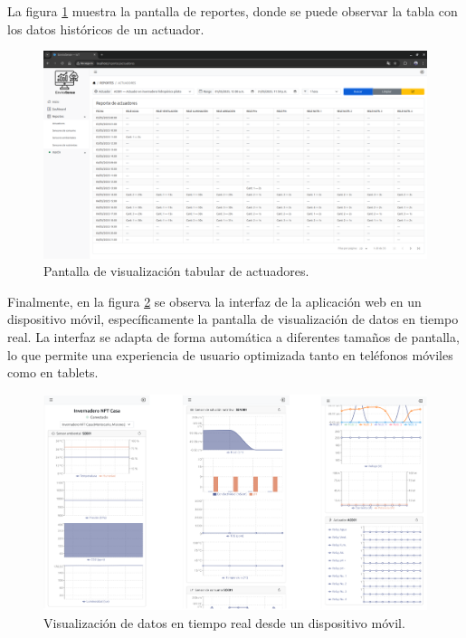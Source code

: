 La figura \ref{fig:reportes_tabla_actuadores} muestra la pantalla de reportes,
donde se puede observar la tabla con los datos históricos de un actuador.

\begin{figure}[H]
    \centering
    \includegraphics[width=\textwidth]{./Images/28_reportes_3.png}
    \caption{Pantalla de visualización tabular de actuadores.}
    \label{fig:reportes_tabla_actuadores}
\end{figure}

Finalmente, en la figura \ref{fig:dashboard_celular} se observa la interfaz de
la aplicación web en un dispositivo móvil, específicamente la pantalla de
visualización de datos en tiempo real. La interfaz se adapta de forma
automática a diferentes tamaños de pantalla, lo que permite una experiencia de
usuario optimizada tanto en teléfonos móviles como en tablets.

\begin{figure}[H]
    \centering
    \includegraphics[width=\textwidth]{./Images/29_dashboard_celular.png}
    \caption{Visualización de datos en tiempo real desde un dispositivo móvil.}
    \label{fig:dashboard_celular}
\end{figure}

